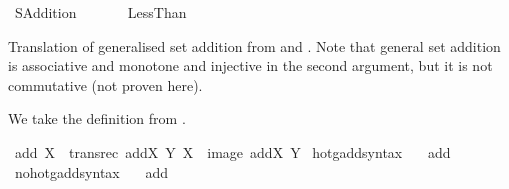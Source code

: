 %
\begin{isabellebody}%
%
%
\isadelimdocument
%
\endisadelimdocument
%
\isatagdocument
\isanewline
%
\isamarkuptrue%
%
\endisatagdocument
{\isafolddocument}%
%
\isadelimdocument
%
\endisadelimdocument
%
\isadelimtheory
%
\endisadelimtheory
%
\isatagtheory
{}\isamarkupfalse%
\ SAddition\isanewline
\ \ \isanewline
\ \ \ \ Less{\isacharunderscore}{\kern0pt}Than\isanewline
{}%
\endisatagtheory
{\isafoldtheory}%
%
\isadelimtheory
%
\endisadelimtheory
%
\isadelimdocument
%
\endisadelimdocument
%
\isatagdocument
%
\isamarkuptrue%
%
\endisatagdocument
{\isafolddocument}%
%
\isadelimdocument
%
\endisadelimdocument
%
\begin{isamarkuptext}%
Translation of generalised set addition from \cite{kirby_set_arithemtics}
and \cite{ZFC_in_HOL_AFP}. Note that general set addition is associative and
monotone and injective in the second argument,
but it is not commutative (not proven here).%
\end{isamarkuptext}\isamarkuptrue%
%
\begin{isamarkuptext}%
We take the definition from \cite{kirby_set_arithemtics}.%
\end{isamarkuptext}\isamarkuptrue%
\isamarkupfalse%
\ {\isachardoublequoteopen}add\ X\ {\isasymequiv}\ transrec\ {\isacharparenleft}{\kern0pt}{\isasymlambda}addX\ Y{\isachardot}{\kern0pt}\ X\ {\isasymunion}\ image\ addX\ Y{\isacharparenright}{\kern0pt}{\isachardoublequoteclose}\isanewline
\isanewline
{}\isamarkupfalse%
\ hotg{\isacharunderscore}{\kern0pt}add{\isacharunderscore}{\kern0pt}syntax\ \ \isamarkupfalse%
\ add\ {\isacharparenleft}{\kern0pt}\ {\isachardoublequoteopen}{\isacharplus}{\kern0pt}{\isachardoublequoteclose}\ {}{}{\isacharparenright}{\kern0pt}\ \isamarkupfalse%
\isanewline
{}\isamarkupfalse%
\ no{\isacharunderscore}{\kern0pt}hotg{\isacharunderscore}{\kern0pt}add{\isacharunderscore}{\kern0pt}syntax\ \ \isamarkupfalse%
\ add\ {\isacharparenleft}{\kern0pt}\ {\isachardoublequoteopen}{\isacharplus}{\kern0pt}{\isachardoublequoteclose}\ {}{}{\isacharparenright}{\kern0pt}\ \isamarkupfalse%
\isanewline
{}\isamarkupfalse%

\end{isabellebody}
